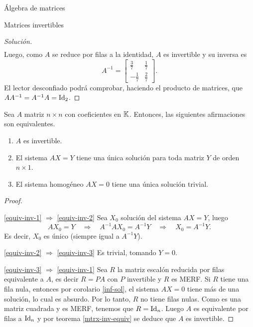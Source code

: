 \begin{chapter}{\'Algebra de matrices}
\begin{section}{Matrices invertibles}
\begin{proof}[Solución]
\begin{align*}
                \end{align*}
                Luego, como $A$ se reduce por filas a la identidad, $A$ es invertible y su inversa es  
                \begin{equation*}
                A^{-1}=\begin{bmatrix}\frac37&\frac17\\-\frac17&\frac27 \end{bmatrix}.
                \end{equation*}
                El lector desconfiado  podrá comprobar, haciendo el producto de matrices, que $AA^{-1} = A^{-1}A=\operatorname{Id}_2$.
            \end{proof}
            
            
            \begin{teorema}\label{mtrx-inv-equiv2} 
                Sea $A$ matriz $n \times n$ con coeficientes en $\mathbb K$. Entonces,  las siguientes afirmaciones son equivalentes. 
                \begin{enumerate}[label=\textit{\roman*)}, ref=\textit{\roman*)}]
                    \item\label{equiv-inv-1} $A$ es invertible.
                    \item\label{equiv-inv-2} El sistema $AX=Y$ tiene una única solución para toda matriz $Y$ de orden $n \times 1$. 
                    \item\label{equiv-inv-3} El sistema homogéneo $AX=0$ tiene una única solución trivial.
                \end{enumerate}
            \end{teorema}
            \begin{proof}

                \

                \ref{equiv-inv-1} $\Rightarrow$  \ref{equiv-inv-2} Sea $X_0$ solución del sistema $AX=Y$, luego
                \begin{equation*}
                AX_0=Y  \quad \Rightarrow \quad  A^{-1}AX_0 = A^{-1}Y  \quad \Rightarrow \quad  X_0 = A^{-1}Y.
                \end{equation*}
                Es decir, $X_0$ es único (siempre igual  a $A^{-1}Y$).  
                
                \ref{equiv-inv-2} $\Rightarrow$  \ref{equiv-inv-3} Es trivial, tomando $Y =0$.
                
                \ref{equiv-inv-3} $\Rightarrow$  \ref{equiv-inv-1} Sea $R$ la matriz escalón reducida por filas equivalente a $A$, es decir $R=PA$ con $P$ invertible y $R$ es MERF. Si $R$ tiene una fila nula, entonces por corolario  \ref{inf-sol},  el sistema $AX =0$ tiene más de una solución, lo cual es absurdo.  Por lo tanto, $R$ no tiene filas nulas. Como es una matriz cuadrada y es MERF, tenemos que $R=\operatorname{Id}_n$. Luego $A$ es equivalente por filas a $\operatorname{Id}_n$ y por teorema \ref{mtrx-inv-equiv} se deduce que $A$ es invertible.             
                

\end{proof}
\end{section}
\end{chapter}
